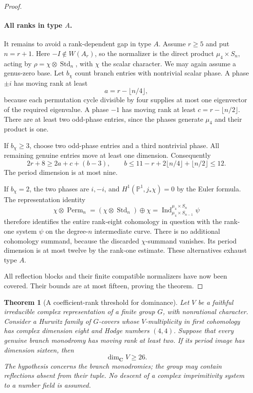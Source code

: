 \documentclass[11pt]{article}
\newtheorem{theorem}{Theorem}[section]
\theoremstyle{definition}
\theoremstyle{remark}
\newcommand{\C}{\mathbf C}
\begin{document}
\begin{proof}
\paragraph{All ranks in type $A$.}
It remains to avoid a rank-dependent gap in type $A$.
Assume $r\ge5$ and put $n=r+1$. Here $-I\notin W(A_r)$, so the
normalizer is the direct product $\mu_4\times S_n$, acting by
$\rho=\chi\otimes\operatorname{Std}_n$, with $\chi$ the scalar character.
We may again assume a genus-zero base. Let $b_\chi$ count branch
entries with nontrivial scalar phase. A phase $\pm i$ has moving
rank at least
\[
 a=r-\lfloor n/4\rfloor,
\]
because each permutation cycle divisible by four supplies at most
one eigenvector of the required eigenvalue. A phase $-1$ has moving
rank at least $c=r-\lfloor n/2\rfloor$. There are at least two
odd-phase entries, since the phases generate $\mu_4$ and their
product is one.

If $b_\chi\ge3$, choose two odd-phase entries and a third nontrivial
phase. All remaining genuine entries move at least one dimension.
Consequently
\[
 2r+8\ge2a+c+(b-3),\qquad
 b\le11-r+2\lfloor n/4\rfloor+\lfloor n/2\rfloor\le12.
\]
The period dimension is at most nine.

If $b_\chi=2$, the two phases are $i,-i$, and
$H^1(\mathbb P^1,j_*\chi)=0$ by the Euler formula. The representation identity
\[
 \chi\otimes\operatorname{Perm}_n
  =(\chi\otimes\operatorname{Std}_n)\oplus\chi
  =\operatorname{Ind}_{\mu_4\times S_{n-1}}^{\mu_4\times S_n}\psi
\]
therefore identifies the entire rank-eight cohomology in question
with the rank-one system $\psi$ on the degree-$n$
intermediate curve. There is no additional cohomology summand,
because the discarded $\chi$-summand vanishes. Its period dimension
is at most twelve by the rank-one estimate. These alternatives exhaust type $A$.

All reflection blocks and their finite compatible normalizers have
now been covered. Their bounds are at most fifteen, proving the theorem.
\end{proof}

\begin{theorem}[A coefficient-rank threshold for dominance]\label{thm:finite-cover-rank}
Let $V$ be a faithful irreducible complex representation of a finite group $G$, with nonrational character. Consider a Hurwitz family of $G$-covers whose $V$-multiplicity in first cohomology has complex dimension eight and Hodge numbers $(4,4)$. Suppose that every genuine branch monodromy has moving rank at least two. If its period image has dimension sixteen, then
\[
 \dim_{\C}V\ge26.
\]
The hypothesis concerns the branch monodromies; the group may contain reflections absent from their tuple. No descent of a complex imprimitivity system to a number field is assumed.
\end{theorem}
\end{document}
